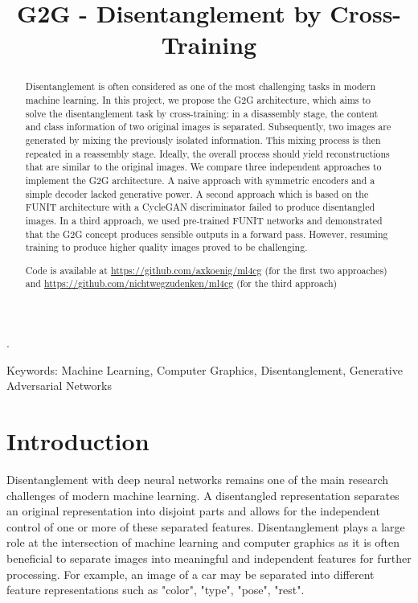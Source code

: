 \documentclass[conference]{IEEEtran}
\begin{document}
\title{\Large \bf G2G - Disentanglement by Cross-Training}
\author{

\and
{}
}
\maketitle
\begin{abstract}
Disentanglement is often considered as one of the most challenging tasks in modern machine learning. In this project, we propose the G2G architecture, which aims to solve the disentanglement task by cross-training: in a disassembly stage, the content and class information of two original images is separated. Subsequently, two images are generated by mixing the previously isolated information. This mixing process is then repeated in a reassembly stage. Ideally, the overall process should yield reconstructions that are similar to the original images. We compare three independent approaches to implement the G2G architecture. A naive approach with symmetric encoders and a simple decoder lacked generative power. A second approach which is based on the FUNIT architecture with a CycleGAN discriminator failed to produce disentangled images. In a third approach, we used pre-trained FUNIT networks and demonstrated that the G2G concept produces sensible outputs in a forward pass. However, resuming training to produce higher quality images proved to be challenging. 

Code is available at \url{https://github.com/axkoenig/ml4cg} (for the first two approaches) and   
\url{https://github.com/nichtwegzudenken/ml4cg} (for the third approach)\end{abstract}.

Keywords: Machine Learning, Computer Graphics, Disentanglement, Generative Adversarial Networks
\IEEEpeerreviewmaketitle

\label{chap1_introduction}
\section{Introduction}
Disentanglement with deep neural networks remains one of the main research challenges of modern machine learning. A disentangled representation separates an original representation into disjoint parts and allows for the independent control of one or more of these separated features. Disentanglement plays a large role at the intersection of machine learning and computer graphics as it is often beneficial to separate images into meaningful and independent features for further processing. For example, an image of a car may be separated into different feature representations such as "color", "type", "pose", "rest". 
\end{document}
